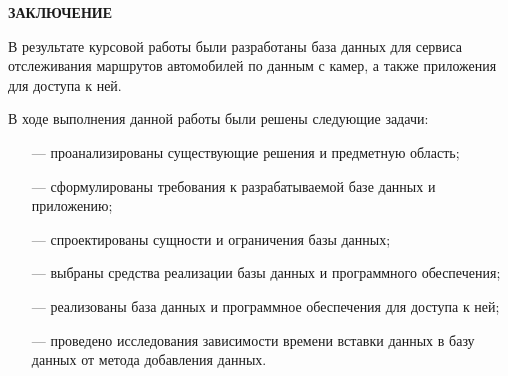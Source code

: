 \begin{center}
    \textbf{ЗАКЛЮЧЕНИЕ}
\end{center}

В результате курсовой работы были разработаны база данных для сервиса отслеживания маршрутов автомобилей по данным с камер, а также приложения для доступа к ней.
    
В ходе выполнения данной работы были решены следующие задачи:

\begin{itemize}
    \item[---] проанализированы существующие решения и предметную область;
    \item[---] сформулированы требования к разрабатываемой базе данных и приложению;
    \item[---] спроектированы сущности и ограничения базы данных;
    \item[---] выбраны средства реализации базы данных и программного обеспечения;
    \item[---] реализованы база данных и программное обеспечения для доступа к ней;
    \item[---] проведено исследования зависимости времени вставки данных в базу данных от метода добавления данных.
\end{itemize}